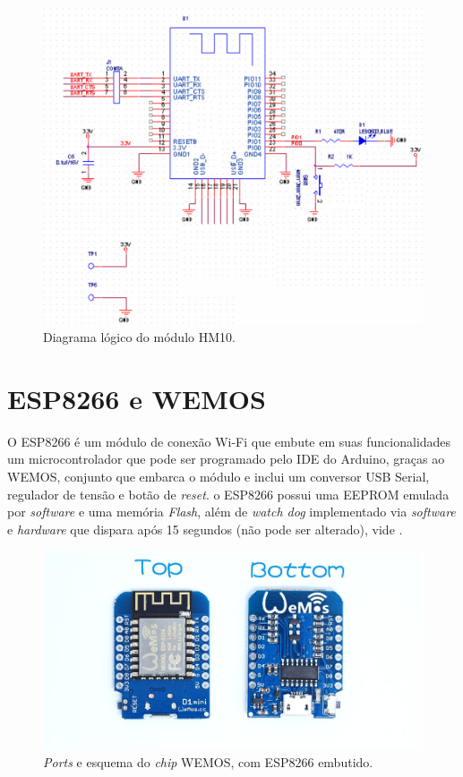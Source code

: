 \documentclass[
	12pt,				%
	openright,			%
	twoside,			%
	a4paper,			%
	english,			%
	french,				%
	spanish,			%
	brazil				%
	]{abntex2}
\begin{document}
\begin{figure}[h]
    \centering
    \includegraphics[width=\linewidth]{hm-10-pinout}
    \caption{Diagrama lógico do módulo HM10.}
    \label{fig:hm10}
\end{figure}

\section{ESP8266 e WEMOS}

O ESP8266 é um módulo de conexão Wi-Fi que embute em suas funcionalidades um microcontrolador que pode ser programado pelo IDE do Arduino, graças ao WEMOS, conjunto que embarca o módulo e inclui um conversor USB Serial, regulador de tensão e botão de \textit{reset}. o ESP8266 possui uma EEPROM emulada por \textit{software} e uma memória \textit{Flash}, além de \textit{watch dog} implementado via \textit{software} e \textit{hardware} que dispara após 15 segundos (não pode ser alterado), vide .

\begin{figure}[t!]
    \centering
    \includegraphics[width=\linewidth]{wemos-pinout}
    \caption{\textit{Ports} e esquema do \textit{chip} WEMOS, com ESP8266 embutido.}
    \label{fig:hm10}
\end{figure}
\end{document}
